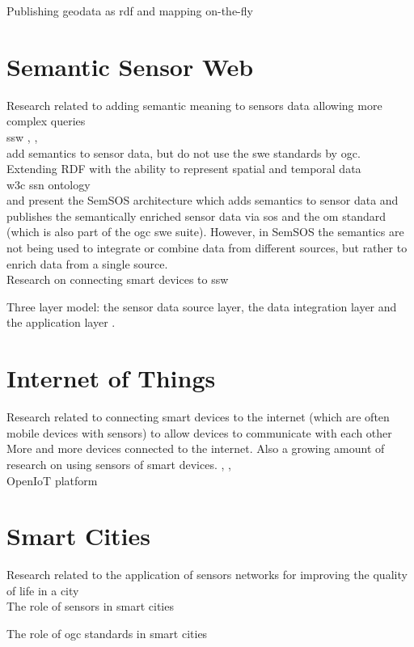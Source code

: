 Publishing geodata as \ac{rdf} and mapping on-the-fly \citep{LD:Missier}


\section{Semantic Sensor Web}
Research related to adding semantic meaning to sensors data allowing more complex queries \\ 

\ac{ssw} \citep{SSW:Sheth}, \citep{SSW:deMel}, \citep{SSW:Bakillah} \\ 

\cite{SSW:Huang} add semantics to sensor data, but do not use the \ac{swe} standards by \ac{ogc}. \\ 

Extending RDF with the ability to represent spatial and temporal data \citep{SSW:Koubarakis} \\ 

\ac{w3c} \ac{ssn} ontology \citep{SSW:SSN_incubatorGroup} \\ 

\cite{SSW:Henson} and \cite{SSW:Pschorr} present the SemSOS architecture which adds semantics to sensor data and publishes the semantically enriched sensor data via \ac{sos} and the \ac{om} standard (which is also part of the \ac{ogc} \ac{swe} suite). However, in SemSOS the semantics are not being used to integrate or combine data from different sources, but rather to enrich data from a single source. \\ 

Research on connecting smart devices to \ac{ssw} \citep{SSW:Vera}  

Three layer model: the sensor data source layer, the data integration layer and the application layer \cite{SSW:Wang}.

\section{Internet of Things}
Research related to connecting smart devices to the internet (which are often mobile devices with sensors) to allow devices to communicate with each other \\

More and more devices connected to the internet. Also a growing amount of research on using sensors of smart devices. \citep{IOT:Waher}, \citep{IOT:Zarko}, \citep{SSW:Calbimonte} \\


OpenIoT platform \citep{IOT:Calbimonte}


\section{Smart Cities}
Research related to the application of sensors networks for improving the quality of life in a city \\ 

The role of sensors in smart cities \citep{IOT:Zanelli}

The role of \ac{ogc} standards in smart cities \citep{SC:OGC}

